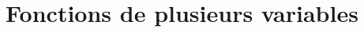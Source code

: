 \newcommand{\multivar}{/home/robin/ENSEIGN/Cours/MathBiologie/L3-ENS-Math1/Exercices/MultiVar}

\section{Fonctions de plusieurs variables} 














